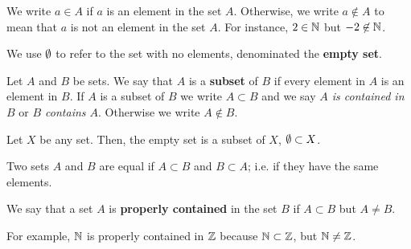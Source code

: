 We write $a\in A$ if $a$ is an element in the set $A$. Otherwise, we write $a\notin A$ to mean that $a$ is not an element in the set $A$. For instance, $2\in\mathbb{N}$ but $-2\not\in \mathbb{N}$.


\begin{defi}
    We use $\emptyset$ to refer to the set with no elements, denominated the \textbf{empty set}.
\end{defi}

\begin{defi}[Subset]
    Let $A$ and $B$ be sets. We say that $A$ is a \textbf{subset} of $B$ if every element in $A$ is an element in $B$. If $A$ is a subset of $B$ we write $A\subset B$ and we say \textit{$A$ is contained in $B$} or \textit{$B$ contains $A$}. Otherwise we write $A\notin B$.
\end{defi}

\begin{remark}
    Let $X$ be any set. Then, the empty set is a subset of $X$, $\emptyset\subset X$.
\end{remark}


\begin{defi}
    Two sets $A$ and $B$ are equal if $A \subset B$ and $B\subset A$; i.e. if they have the same elements.
\end{defi}

\begin{defi}
    We say that a set $A$ is \textbf{properly contained} in the set $B$ if $A\subset B$ but $A\neq B$.
\end{defi}

For example, $\mathbb{N}$ is properly contained in $\mathbb{Z}$ because $\mathbb{N}\subset\mathbb{Z}$, but $\mathbb{N}\neq\mathbb{Z}$.

